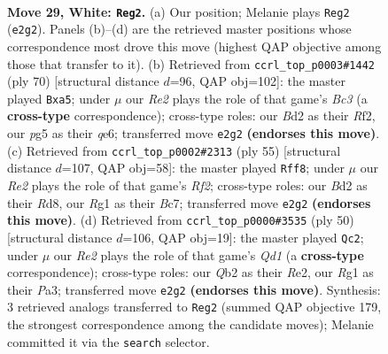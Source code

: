 \documentclass[11pt]{article}
\begin{document}
\clearpage

\begin{figure}[p]\centering
\begin{subfigure}{0.46\textwidth}\centering
\resizebox{\linewidth}{!}{%
\newchessgame
\chessboard[
  setfen={1r1rn1k1/p1p2p2/8/2Pp1qpp/5P2/1P2P1P1/1Q1BR2P/4KBR1 w - - 0 29},
  showmover=false,
  pgfstyle=straightmove, color=movearrow, markmove={e2-g2}
]}
\caption{}
\end{subfigure}\hfill
\begin{subfigure}{0.46\textwidth}\centering
\resizebox{\linewidth}{!}{%
\newchessgame
\chessboard[
  setfen={4r1k1/2p2r1p/2p1qPp1/p5P1/P3p3/1PB1Q3/1KP2R1P/8 w - - 6 36},
  showmover=false,
  pgfstyle=straightmove, color=movearrow, markmove={c3-a5}
]}
\caption{}
\end{subfigure}
\\[4pt]
\begin{subfigure}{0.46\textwidth}\centering
\resizebox{\linewidth}{!}{%
\newchessgame
\chessboard[
  setfen={3r3k/2b2rpp/pq6/1p1p3P/5p2/PQ6/1PP3B1/1K1RR3 b - - 3 28},
  showmover=false,
  pgfstyle=straightmove, color=movearrow, markmove={f7-f8}
]}
\caption{}
\end{subfigure}\hfill
\begin{subfigure}{0.46\textwidth}\centering
\resizebox{\linewidth}{!}{%
\newchessgame
\chessboard[
  setfen={r3r1k1/3q1pp1/1p5p/np1pP3/2pP1P2/P1P4P/4RBP1/2RQ2K1 w - - 0 26},
  showmover=false,
  pgfstyle=straightmove, color=movearrow, markmove={d1-c2}
]}
\caption{}
\end{subfigure}
\caption{\textbf{Move 29, White: \texttt{Reg2}.} (a) Our position; Melanie plays \texttt{Reg2} (\texttt{e2g2}). Panels (b)--(d) are the retrieved master positions whose correspondence most drove this move (highest QAP objective among those that transfer to it). (b) Retrieved from \texttt{ccrl\_top\_p0003\#1442} (ply 70) [structural distance $d$=96, QAP obj=102]: the master played \texttt{Bxa5}; under $\mu$ our \emph{Re2} plays the role of that game's \emph{Bc3} (a \textbf{cross-type} correspondence); cross-type roles: our \emph{B}d2 as their \emph{R}f2, our \emph{p}g5 as their \emph{q}e6; transferred move \texttt{e2g2} \textbf{(endorses this move)}. (c) Retrieved from \texttt{ccrl\_top\_p0002\#2313} (ply 55) [structural distance $d$=107, QAP obj=58]: the master played \texttt{Rff8}; under $\mu$ our \emph{Re2} plays the role of that game's \emph{Rf2}; cross-type roles: our \emph{B}d2 as their \emph{R}d8, our \emph{R}g1 as their \emph{B}c7; transferred move \texttt{e2g2} \textbf{(endorses this move)}. (d) Retrieved from \texttt{ccrl\_top\_p0000\#3535} (ply 50) [structural distance $d$=106, QAP obj=19]: the master played \texttt{Qc2}; under $\mu$ our \emph{Re2} plays the role of that game's \emph{Qd1} (a \textbf{cross-type} correspondence); cross-type roles: our \emph{Q}b2 as their \emph{R}e2, our \emph{R}g1 as their \emph{P}a3; transferred move \texttt{e2g2} \textbf{(endorses this move)}. Synthesis: 3 retrieved analogs transferred to \texttt{Reg2} (summed QAP objective 179, the strongest correspondence among the candidate moves); Melanie committed it via the \texttt{search} selector.}
\label{fig:thought-m56}
\end{figure}
\end{document}
